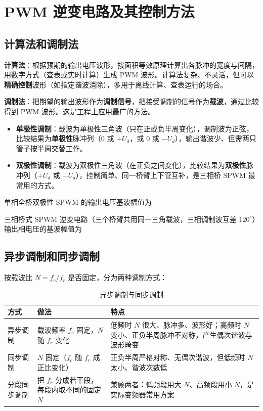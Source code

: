 \section{PWM 逆变电路及其控制方法}

\subsection{计算法和调制法}

\textbf{计算法}：根据预期的输出电压波形，按面积等效原理计算出各脉冲的宽度与间隔，用数字方式（查表或实时计算）生成 PWM 波形。计算法复杂、不灵活，但可以\textbf{精确控制}波形（如指定谐波消除），多用于离线计算、查表运行的场合。

\textbf{调制法}：把期望的输出波形作为\textbf{调制信号}，把接受调制的信号作为\textbf{载波}，通过比较得到 PWM 波形。这是工程上应用最广的方法。

\begin{itemize}
  \item \textbf{单极性调制}：载波为单极性三角波（只在正或负半周变化），调制波为正弦，比较结果为\textbf{单极性}脉冲列（$0$ 或 $+U_d$，或 $0$ 或 $-U_d$），输出谐波少、但需两只管子按半周交替工作。
  \item \textbf{双极性调制}：载波为双极性三角波（在正负之间变化），比较结果为\textbf{双极性}脉冲列（$+U_d$ 或 $-U_d$），控制简单、同一桥臂上下管互补，是三相桥 SPWM 最常用的方式。
\end{itemize}

单相全桥双极性 SPWM 的输出电压基波幅值为


三相桥式 SPWM 逆变电路（三个桥臂共用同一三角载波，三相调制波互差 $120^\circ$）输出相电压的基波幅值为


\subsection{异步调制和同步调制}

按载波比 $N=f_c/f_r$ 是否固定，分为两种调制方式：

\begin{table}[htbp]
\centering
\caption{异步调制与同步调制}
\label{tab:7-1}
\begin{tabular}{p{2.4cm}p{5.4cm}p{6.2cm}}
\toprule
\textbf{方式} & \textbf{做法} & \textbf{特点} \\
\midrule
异步调制 & 载波频率 $f_c$ 固定，$N$ 随 $f_r$ 变化 & 低频时 $N$ 很大、脉冲多、波形好；高频时 $N$ 变小、正负半周脉冲不对称，产生偶次谐波与波形畸变 \\
同步调制 & $N$ 固定（$f_c$ 随 $f_r$ 成正比变化） & 正负半周严格对称、无偶次谐波，但低频时 $N$ 太小、谐波次数低 \\
分段同步调制 & 把 $f_r$ 分成若干段，每段内取不同的固定 $N$ & 兼顾两者：低频段用大 $N$、高频段用小 $N$，是实际变频器常用方案 \\
\bottomrule
\end{tabular}
\end{table}

